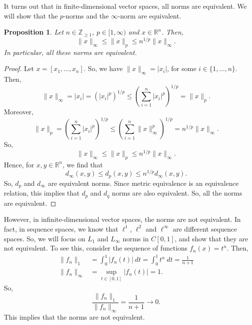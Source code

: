\documentclass[a4paper, openany]{memoir}
\theoremstyle{definition}
\theoremstyle{plain}
\newtheorem{proposition}[definition]{Proposition}
\begin{document}
    It turns out that in finite-dimensional vector spaces, all norms are equivalent. We will show that the $p$-norms and the $\infty$-norm are equivalent.
    \begin{proposition}
        Let $n \in \mathbb{Z}_{\geq 1}$, $p \in [1, \infty)$ and $x \in \mathbb{R}^n$. Then,
        \[\lVert x \rVert_\infty \leq \lVert x \rVert_p \leq n^{1/p} \lVert x \rVert_\infty.\]
        In particular, all these norms are equivalent.
    \end{proposition}
    \begin{proof}
        Let $x = [x_1, \dots, x_n]$. So, we have $\lVert x \rVert_\infty = |x_i|$, for some $i \in \{1, \dots, n\}$. Then,
        \[\lVert x \rVert_\infty = |x_i| = \left(|x_i|^p\right)^{1/p} \leq \left(\sum_{i=1}^n |x_i|^p\right)^{1/p} = \lVert x \rVert_p.\]
        Moreover,
        \[\lVert x \rVert_p = \left(\sum_{i=1}^n |x_i|^p \right)^{1/p} \leq \left(\sum_{i=1}^n \lVert x \rVert_\infty^p \right)^{1/p} = n^{1/p} \lVert x \rVert_\infty.\]
        So,
        \[\lVert x \rVert_\infty \leq \lVert x \rVert_p \leq n^{1/p} \lVert x \rVert_\infty.\]
        Hence, for $x, y \in \mathbb{R}^n$, we find that
        \[d_\infty(x, y) \leq d_p(x, y) \leq n^{1/p} d_\infty(x, y).\]
        So, $d_p$ and $d_\infty$ are equivalent norms. Since metric equivalence is an equivalence relation, this implies that $d_p$ and $d_q$ norms are also equivalent. So, all the norms are equivalent.
    \end{proof}

    However, in infinite-dimensional vector spaces, the norms are not equivalent. In fact, in sequence spaces, we know that $\ell^1$, $\ell^2$ and $\ell^\infty$ are different sequence spaces. So, we will focus on $L_1$ and $L_\infty$ norms in $C[0, 1]$, and show that they are not equivalent. To see this, consider the sequence of functions $f_n(x) = t^n$. Then,
    \begin{align*}
        \lVert f_n \rVert_1 &= \int_0^1 |f_n(t)| \ dt = \int_0^1 t^n \ dt = \frac{1}{n+1} \\
        \lVert f_n \rVert_\infty &= \sup_{t \in [0, 1]} |f_n(t)| = 1.
    \end{align*}
    So,
    \[\frac{\lVert f_n \rVert_1}{\lVert f_n \rVert_\infty} = \frac{1}{n+1} \to 0.\]
    This implies that the norms are not equivalent.
    
    \newpage
\end{document}
